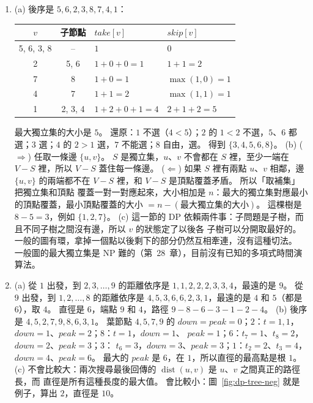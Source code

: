 \begin{enumerate}
\item (a) 後序是 $5, 6, 2, 3, 8, 7, 4, 1$：
\begin{center}
\begin{tabular}{ccll}
\toprule
$v$ & 子節點 & $\mathit{take}[v]$ & $\mathit{skip}[v]$ \\
\midrule
5, 6, 3, 8 & -- & $1$ & $0$ \\
2 & 5, 6 & $1 + 0 + 0 = 1$ & $1 + 1 = 2$ \\
7 & 8 & $1 + 0 = 1$ & $\max(1, 0) = 1$ \\
4 & 7 & $1 + 1 = 2$ & $\max(1, 1) = 1$ \\
1 & 2, 3, 4 & $1 + 2 + 0 + 1 = 4$ & $2 + 1 + 2 = 5$ \\
\bottomrule
\end{tabular}
\end{center}
最大獨立集的大小是 $5$。 還原：$1$ 不選（$4 < 5$）；$2$ 的 $1 < 2$ 不選，$5$、$6$ 都選；$3$
選；$4$ 的 $2 > 1$ 選，$7$ 不能選；$8$ 自由，選。 得到 $\{3, 4, 5, 6, 8\}$。
(b) ($\Rightarrow$) 任取一條邊 $\{u, v\}$。 $S$ 是獨立集，$u$、$v$ 不會都在 $S$ 裡，至少一端在
$V - S$ 裡，所以 $V - S$ 蓋住每一條邊。 ($\Leftarrow$) 如果 $S$ 裡有兩點 $u$、$v$ 相鄰，邊
$\{u, v\}$ 的兩端都不在 $V - S$ 裡，和 $V - S$ 是頂點覆蓋矛盾。 所以「取補集」把獨立集和頂點
覆蓋一對一對應起來，大小相加是 $n$：最大的獨立集對應最小的頂點覆蓋，最小頂點覆蓋的大小
$= n - (\text{最大獨立集的大小})$。 這棵樹是 $8 - 5 = 3$，例如 $\{1, 2, 7\}$。
(c) 這一節的 DP 依賴兩件事：子問題是子樹，而且不同子樹之間沒有邊，所以 $v$ 的狀態定了以後各
子樹可以分開取最好的。 一般的圖有環，拿掉一個點以後剩下的部分仍然互相牽連，沒有這種切法。
一般圖的最大獨立集是 NP 難的（第~28~章），目前沒有已知的多項式時間演算法。

\item (a) 從 $1$ 出發，到 $2, 3, \ldots, 9$ 的距離依序是 $1, 1, 2, 2, 2, 3, 3, 4$，最遠的是
$9$。 從 $9$ 出發，到 $1, 2, \ldots, 8$ 的距離依序是 $4, 5, 3, 6, 6, 2, 3, 1$，最遠的是 $4$ 和
$5$（都是 $6$），取 $4$。 直徑是 $6$，端點 $9$ 和 $4$，路徑 $9 - 8 - 6 - 3 - 1 - 2 - 4$。
(b) 後序是 $4, 5, 2, 7, 9, 8, 6, 3, 1$。 葉節點 $4, 5, 7, 9$ 的 $\mathit{down} = \mathit{peak} =
0$；$2$：$t = 1, 1$，$\mathit{down} = 1$、$\mathit{peak} = 2$；$8$：$t = 1$，$\mathit{down} = 1$、
$\mathit{peak} = 1$；$6$：$t_7 = 1$、$t_8 = 2$，$\mathit{down} = 2$、$\mathit{peak} = 3$；$3$：
$t_6 = 3$，$\mathit{down} = 3$、$\mathit{peak} = 3$；$1$：$t_2 = 2$、$t_3 = 4$，$\mathit{down} =
4$、$\mathit{peak} = 6$。 最大的 $\mathit{peak}$ 是 $6$，在 $1$，所以直徑的最高點是根 $1$。
(c) 不會比較大：兩次搜尋最後回傳的 $\operatorname{dist}(u, v)$ 是 $u$、$v$ 之間真正的路徑長，而
直徑是所有這種長度的最大值。 會比較小：圖~\ref{fig:dp-tree-neg} 就是例子，算出 $2$，直徑是
$10$。


\end{enumerate}
